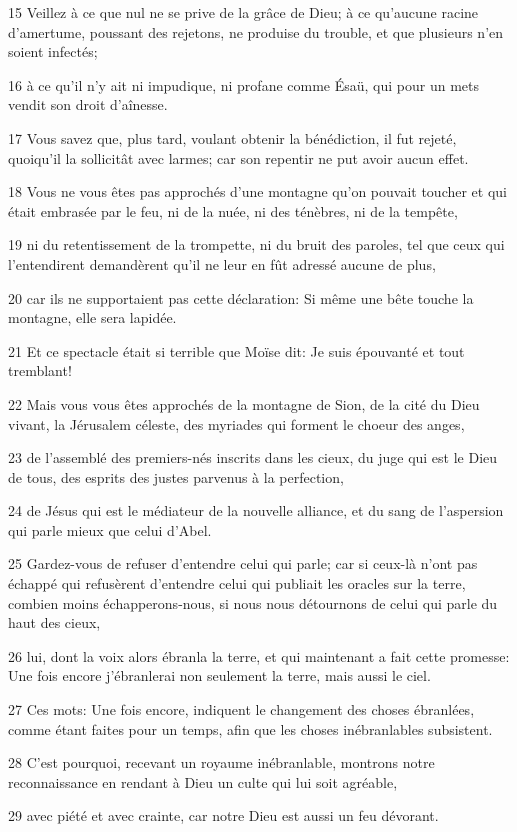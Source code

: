 \par 15 Veillez à ce que nul ne se prive de la grâce de Dieu; à ce qu'aucune racine d'amertume, poussant des rejetons, ne produise du trouble, et que plusieurs n'en soient infectés;
\par 16 à ce qu'il n'y ait ni impudique, ni profane comme Ésaü, qui pour un mets vendit son droit d'aînesse.
\par 17 Vous savez que, plus tard, voulant obtenir la bénédiction, il fut rejeté, quoiqu'il la sollicitât avec larmes; car son repentir ne put avoir aucun effet.
\par 18 Vous ne vous êtes pas approchés d'une montagne qu'on pouvait toucher et qui était embrasée par le feu, ni de la nuée, ni des ténèbres, ni de la tempête,
\par 19 ni du retentissement de la trompette, ni du bruit des paroles, tel que ceux qui l'entendirent demandèrent qu'il ne leur en fût adressé aucune de plus,
\par 20 car ils ne supportaient pas cette déclaration: Si même une bête touche la montagne, elle sera lapidée.
\par 21 Et ce spectacle était si terrible que Moïse dit: Je suis épouvanté et tout tremblant!
\par 22 Mais vous vous êtes approchés de la montagne de Sion, de la cité du Dieu vivant, la Jérusalem céleste, des myriades qui forment le choeur des anges,
\par 23 de l'assemblé des premiers-nés inscrits dans les cieux, du juge qui est le Dieu de tous, des esprits des justes parvenus à la perfection,
\par 24 de Jésus qui est le médiateur de la nouvelle alliance, et du sang de l'aspersion qui parle mieux que celui d'Abel.
\par 25 Gardez-vous de refuser d'entendre celui qui parle; car si ceux-là n'ont pas échappé qui refusèrent d'entendre celui qui publiait les oracles sur la terre, combien moins échapperons-nous, si nous nous détournons de celui qui parle du haut des cieux,
\par 26 lui, dont la voix alors ébranla la terre, et qui maintenant a fait cette promesse: Une fois encore j'ébranlerai non seulement la terre, mais aussi le ciel.
\par 27 Ces mots: Une fois encore, indiquent le changement des choses ébranlées, comme étant faites pour un temps, afin que les choses inébranlables subsistent.
\par 28 C'est pourquoi, recevant un royaume inébranlable, montrons notre reconnaissance en rendant à Dieu un culte qui lui soit agréable,
\par 29 avec piété et avec crainte, car notre Dieu est aussi un feu dévorant.

